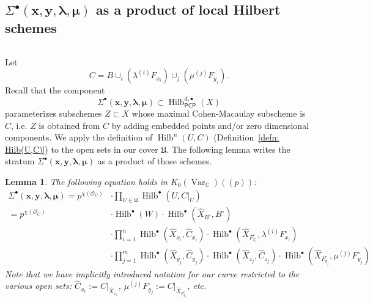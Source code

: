 \documentclass[12pt]{amsart}
\newtheorem{lemma}[theorem]{Lemma}
\theoremstyle{definition}
\newcommand{\CC} {\mathbb{C}}          %
\renewcommand{\O}{\mathcal{O}}
\newcommand{\Hilb}{\operatorname{Hilb}}
\newcommand{\Var}{\operatorname{Var}}
\newcommand{\boldx}{\boldsymbol{x}}
\newcommand{\boldy}{\boldsymbol{y}}
\newcommand{\boldlambda}{\boldsymbol{\lambda }}
\newcommand{\boldmu}{\boldsymbol{\mu }}
\newcommand{\Sigmaxylambdamu}{\Sigma^{\bullet }(\boldx ,\boldy ,\boldlambda ,\boldmu )}
\renewcommand{\hat}{\widehat}
\newcommand{\Xhat}{\widehat{X}}
\newcommand{\PCP}{\mathsf{PCP}}
\newcommand{\SubSecSpace}{$\,$\vspace{0.2cm}\par } %
\begin{document}
\subsection{ $\Sigmaxylambdamu $ as a product of local Hilbert
schemes}\label{subsec: products of local Hilbert schemes}\SubSecSpace
Let
\[
C=B\cup_{i}\left(\lambda^{(i)}F_{x_{i}}
\right)\cup_{j}\left(\mu^{(j)}F_{y_{j}} \right).
\]
Recall that the component
\[
\Sigmaxylambdamu \subset \Hilb^{d,\bullet}_{\PCP}(X)
\]
parameterizes subschemes $Z\subset X$ whose maximal Cohen-Macaulay
subscheme is $C$, i.e. $Z$ is obtained from $C$ by adding embedded
points and/or zero dimensional components. We apply the definition of
$\Hilb^{n}(U,C)$ (Definition~\ref{defn: Hilb(U,C)}) to the open sets
in our cover $\mathfrak{U}$. The following lemma writes the stratum
$\Sigma^{\bullet}(\boldx ,\boldy ,\boldlambda ,\boldmu ) $ as a
product of those schemes.
\begin{lemma}\label{lem: Sigma = product of local Hilbert schemes}
The following equation holds in $K_{0}(\Var_{\CC})(\!(p)\!)$:
\begin{align*}
\Sigmaxylambdamu = p^{\chi
(\O_{C})}&\cdot  \prod_{U\in \mathfrak{U}} \Hilb^{\bullet}(U,C|_{U})\\
=p^{\chi (\O_{C})}& \cdot  \Hilb^{\bullet}(W)\cdot
\Hilb^{\bullet}(\Xhat_{B^{\circ }},B^{\circ})\\
&\cdot \prod_{i=1}^{n}
\Hilb^{\bullet}(\Xhat_{x_{i}},\hat{C}_{x_{i}})\cdot
\Hilb^{\bullet}(\Xhat_{F^{\circ }_{x_{i}}},\lambda^{(i)}F^{\circ}_{x_{i}})\\
&\cdot \prod_{j=1}^{m}
\Hilb^{\bullet}(\Xhat_{y_{j}},\hat{C}_{y_{j}})\cdot
\Hilb^{\bullet}(\Xhat_{z_{j}},\hat{C}_{z_{j}})\cdot
\Hilb^{\bullet}(\Xhat_{F^{\circ }_{y_{j}}},\mu^{(j)}F^{\circ}_{y_{j}})
\end{align*}
Note that we have implicitly introduced notation for our curve
restricted to the various open sets: $\hat{C}_{x_{i}}:=C|_{\Xhat_{x_{i}}}$,
$ \mu^{(j)}F^{\circ}_{y_{j}}:=C|_{\Xhat_{F^{\circ }_{y_{j}}}}$, etc.
\end{lemma}
\end{document}
